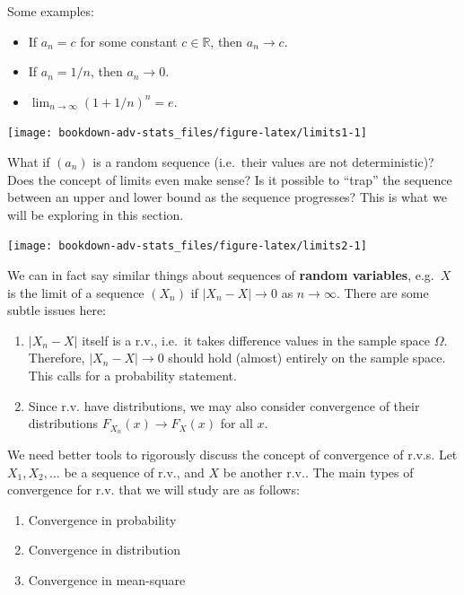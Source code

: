 \documentclass[
]{book}
\providecommand{\tightlist}{%
  \setlength{\itemsep}{0pt}\setlength{\parskip}{0pt}}
\newcommand{\bbR}{\mathbb{R}}
\theoremstyle{definition}
\theoremstyle{definition}
\theoremstyle{definition}
\theoremstyle{definition}
\theoremstyle{remark}
\begin{document}
Some examples:

\begin{itemize}
\tightlist
\item
  If \(a_n=c\) for some constant \(c\in\bbR\), then \(a_n\to c\).
\item
  If \(a_n=1/n\), then \(a_n\to 0\).
\item
  \(\lim_{n\to\infty}(1+1/n)^n = e\).
\end{itemize}

\begin{center}\texttt{[image: bookdown-adv-stats\_files/figure-latex/limits1-1]} \end{center}

What if \((a_n)\) is a random sequence (i.e.~their values are not deterministic)?
Does the concept of limits even make sense?
Is it possible to ``trap'' the sequence between an upper and lower bound as the sequence progresses?
This is what we will be exploring in this section.

\begin{center}\texttt{[image: bookdown-adv-stats\_files/figure-latex/limits2-1]} \end{center}

We can in fact say similar things about sequences of \textbf{random variables}, e.g.~\(X\) is the limit of a sequence
\((X_n)\) if \(|X_n - X|\to 0\) as \(n\to\infty\).
There are some subtle issues here:

\begin{enumerate}
\def\labelenumi{\arabic{enumi}.}
\item
  \(|X_n-X|\) itself is a r.v., i.e.~it takes difference values in the
  sample space \(\Omega\). Therefore, \(|X_n - X|\to 0\) should hold
  (almost) entirely on the sample space. This calls for a probability
  statement.
\item
  Since r.v. have distributions, we may also consider convergence of
  their distributions \(F_{X_n}(x)\to F_X(x)\) for all \(x\).
\end{enumerate}

We need better tools to rigorously discuss the concept of convergence of r.v.s.
Let \(X_1,X_2,\dots\) be a sequence of r.v., and \(X\)
be another r.v.. The main types of convergence for r.v. that we will study are as follows:

\begin{enumerate}
\def\labelenumi{\arabic{enumi}.}
\tightlist
\item
  Convergence in probability
\item
  Convergence in distribution
\item
  Convergence in mean-square
\end{enumerate}
\end{document}
